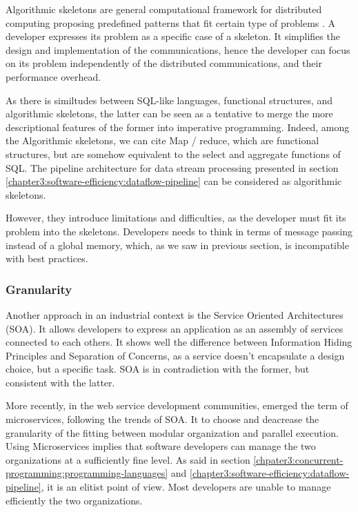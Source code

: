 Algorithmic skeletons are general computational framework for distributed computing proposing predefined patterns that fit certain type of problems \cite{Cole1988, Dean2008, McCool2010, Gonzalez-Velez2010}.
A developer expresses its problem as a specific case of a skeleton.
It simplifies the design and implementation of the communications, hence the developer can focus on its problem independently of the distributed communications, and their performance overhead.

As there is similtudes between SQL-like languages, functional structures, and algorithmic skeletons, the latter can be seen as a tentative to merge the more descriptional features of the former into imperative programming.
Indeed, among the Algorithmic skeletons, we can cite Map / reduce, which are functional structures, but are somehow equivalent to the select and aggregate functions of SQL.
The pipeline architecture for data stream processing presented in section \ref{chapter3:software-efficiency:dataflow-pipeline} can be considered as algorithmic skeletons.

However, they introduce limitations and difficulties, as the developer must fit its problem into the skeletons.
Developers needs to think in terms of message passing instead of a global memory, which, as we saw in previous section, is incompatible with best practices.

\subsubsection{Granularity}

Another approach in an industrial context is the Service Oriented Architectures (SOA).
It allows developers to express an application as an assembly of services connected to each others.
It shows well the difference between Information Hiding Principles and Separation of Concerns, as a service doesn't encapsulate a design choice, but a specific task.
SOA is in contradiction with the former, but consistent with the latter.

More recently, in the web service development communities, emerged the term of microservices, following the trends of SOA.
It to choose and deacrease the granularity of the fitting between modular organization and parallel execution.
Using Microservices implies that software developers can manage the two organizations at a sufficiently fine level.
As said in section \ref{chpater3:concurrent-programming:programming-languages} and \ref{chapter3:software-efficiency:dataflow-pipeline}, it is an elitist point of view.
Most developers are unable to manage efficiently the two organizations.

